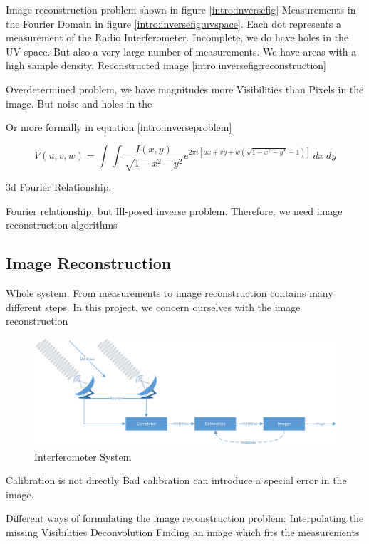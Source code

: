 Image reconstruction problem shown in figure \ref{intro:inversefig}
Measurements in the Fourier Domain in figure \ref{intro:inversefig:uvspace}. Each dot represents a measurement of the Radio Interferometer. Incomplete, we do have holes in the UV space. But also a very large number of measurements. We have areas with a high sample density.
Reconstructed image \ref{intro:inversefig:reconstruction}


Overdetermined problem, we have magnitudes more Visibilities than Pixels in the image. But noise and holes in the 


Or more formally in equation \eqref{intro:inverseproblem}


\begin{equation}\label{intro:inverseproblem}
V(u, v, w) = \int\int \frac{I(x, y)}{\sqrt{1 - x^2 - y ^2}} e^{2 \pi i [ux+vy+ w(\sqrt{1 - x^2 - y ^2} - 1)]} \: dx \: dy
\end{equation}

3d Fourier Relationship.

Fourier relationship, but Ill-posed inverse problem. Therefore, we need image reconstruction algorithms


\subsection{Image Reconstruction}
Whole system.
From measurements to image reconstruction contains many different steps. In this project, we concern ourselves with the image reconstruction

\begin{figure}[h]
	\centering
	\includegraphics[width=0.80\linewidth]{./chapters/01.intro/system.png}
	\caption{Interferometer System}
	\label{intro:system}
\end{figure}

Calibration is not directly
Bad calibration can introduce a special error in the image.

Different ways of formulating the image reconstruction problem:
Interpolating the missing Visibilities
Deconvolution
Finding an image which fits the measurements

